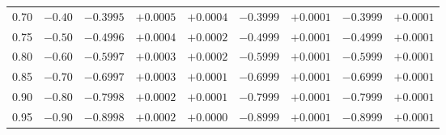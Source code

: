 \documentclass[11pt,reqno]{amsart}
\theoremstyle{plain}
\theoremstyle{definition}
\theoremstyle{remark}
\numberwithin{equation}{section}
\begin{document}
\begin{table}[p]
\begin{tabular}{@{}crrrrrrrr@{}}
0.70 & $-0.40$ & $-0.3995$ & $+0.0005$ & $+0.0004$ & $-0.3999$ & $+0.0001$ & $-0.3999$ & $+0.0001$ \\
0.75 & $-0.50$ & $-0.4996$ & $+0.0004$ & $+0.0002$ & $-0.4999$ & $+0.0001$ & $-0.4999$ & $+0.0001$ \\
0.80 & $-0.60$ & $-0.5997$ & $+0.0003$ & $+0.0002$ & $-0.5999$ & $+0.0001$ & $-0.5999$ & $+0.0001$ \\
0.85 & $-0.70$ & $-0.6997$ & $+0.0003$ & $+0.0001$ & $-0.6999$ & $+0.0001$ & $-0.6999$ & $+0.0001$ \\
0.90 & $-0.80$ & $-0.7998$ & $+0.0002$ & $+0.0001$ & $-0.7999$ & $+0.0001$ & $-0.7999$ & $+0.0001$ \\
0.95 & $-0.90$ & $-0.8998$ & $+0.0002$ & $+0.0000$ & $-0.8999$ & $+0.0001$ & $-0.8999$ & $+0.0001$ \\
\bottomrule
\end{tabular}
\end{table}
\end{document}
